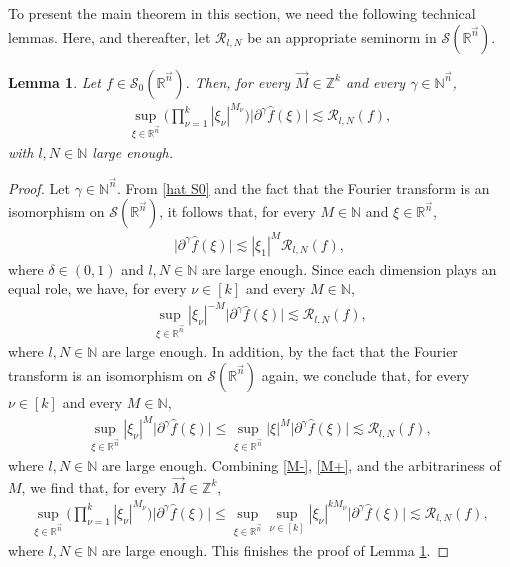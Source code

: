 \documentclass[11pt, reqno]{amsart}
\newtheorem{lemma}[theorem]{Lemma}
\theoremstyle{definition}
\theoremstyle{remark}
\numberwithin{equation}{section}
\newcommand{\N}{\mathbb N}
\newcommand{\R}{\mathbb R}
\newcommand{\Z}{\mathbb Z}
\newcommand{\vn}{\vec n}
\begin{document}
To present the main theorem in this section, we need the following technical lemmas.
Here, and thereafter, let $\mathcal R_{l,N}$ be an appropriate seminorm in $\mathscr S(\mathbb R^{\vn})$.

\begin{lemma}\label{1:00}
Let $f\in\mathscr S_0(\mathbb R^{\vn})$.
Then, for every $\vec M\in
\Z^k$ and every $\gamma\in\N^{\vn}$,
\begin{align*}
\sup_{\xi\in\R^{\vn}}\Big(\prod_{\nu=1}^{k}|\xi_\nu|^{M_\nu}\Big)\Big|
\partial^\gamma\widehat{f}(\xi)\Big|\lesssim\mathcal R_{l,N}(f),
\end{align*}
with $l,N\in\N$ large enough.
\end{lemma}

\begin{proof}
Let $\gamma\in\N^{\vn}$.
From \eqref{hat S0}
and the fact that the Fourier transform is an isomorphism on $\mathscr S(\R^{\vn})$,
it follows that, for every $M\in\mathbb N$ and $\xi\in\R^{\vn}$,
\begin{align*}
\Big|\partial^\gamma\widehat{f}(\xi)\Big|
\lesssim
|\xi_1|^M\mathcal R_{l,N}(f),
\end{align*}
where $\delta\in(0,1)$ and $l,N\in\N$ are large enough.
Since each dimension plays an equal role, we have,
for every $\nu\in[k]$ and every $M\in\N$,
\begin{align}\label{M-}
\sup_{\xi\in\R^{\vn}}|\xi_\nu|^{-M}\Big|\partial^\gamma\widehat{f}(\xi)\Big|
\lesssim\mathcal R_{l,N}(f),
\end{align}
where $l,N\in\N$ are large enough.
In addition, by the fact that the Fourier transform is
an isomorphism on $\mathscr S(\R^{\vn})$ again,
we conclude that, for every $\nu\in[k]$ and every $M\in\N$,
\begin{align}\label{M+}
\sup_{\xi\in\R^{\vn}}|\xi_\nu|^{M}
\Big|\partial^\gamma\widehat{f}(\xi)\Big|\leq
\sup_{\xi\in\R^{\vn}}|\xi|^{M}
\Big|\partial^\gamma\widehat{f}(\xi)\Big|\lesssim\mathcal R_{l,N}(f),
\end{align}
where $l,N\in\N$ are large enough.
Combining \eqref{M-}, \eqref{M+}, and the arbitrariness of $M$,
we find that,
for every $\vec M\in\Z^k$,
\begin{align*}
\sup_{\xi\in\R^{\vn}}\Big(\prod_{\nu=1}^{k}|\xi_\nu|^{M_{\nu}}
\Big)\Big|\partial^\gamma\widehat{f}(\xi)\Big|
\le\sup_{\xi\in\R^{\vn}}\sup_{\nu\in[k]}|\xi_\nu|^{kM_{\nu}}
\Big|\partial^\gamma\widehat{f}(\xi)\Big|\lesssim\mathcal R_{l,N}(f),
\end{align*}
where $l,N\in\N$ are large enough.
This finishes the proof of Lemma \ref{1:00}.
\end{proof}
\end{document}
